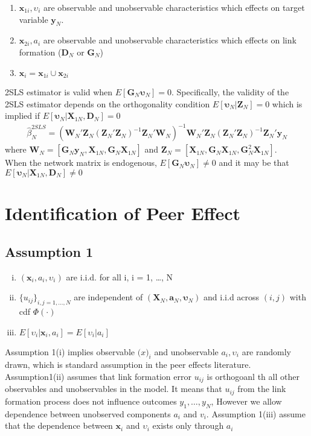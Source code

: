 \documentclass[11pt]{article}
\begin{document}
\begin{enumerate}
\item $\mathbf{x}_{1i} ,\upsilon_{i} $ are observable and unobservable characteristics which effects on target variable $\mathbf{y}_{N}$.
\item $\mathbf{x}_{2i} ,a_{i} $ are observable and unobservable characteristics which effects on link formation ($\mathbf{D}_{N}$ or $\mathbf{G}_{N}$)
\item $\mathbf{x}_{i} = \mathbf{x}_{1i} \cup \mathbf{x}_{2i}$
\end{enumerate}
 2SLS estimator is valid when $E[\mathbf{G}_{N}\boldsymbol{\upsilon}_{N}] = 0$. Specifically, the validity of the 2SLS estimator depends on the orthogonality condition $E[\boldsymbol{\upsilon}_{N}|\mathbf{Z}_{N}] = 0$ which is implied if $E[\boldsymbol{\upsilon}_{N}| \mathbf{X}_{1N},\mathbf{D}_{N}] = 0$
  \begin{align}
\hat{\beta}_{N}^{2SLS} = (\mathbf{W}_{N}'\mathbf{Z}_{N}(\mathbf{Z}_{N}'\mathbf{Z}_{N})^{-1}\mathbf{Z}_{N}'\mathbf{W}_{N})^{-1}\mathbf{W}_{N}'\mathbf{Z}_{N}(\mathbf{Z}_{N}'\mathbf{Z}_{N})^{-1}\mathbf{Z}_{N}'\mathbf{y}_{N}
  \end{align}
where $\mathbf{W}_{N} = [\mathbf{G}_{N}\mathbf{y}_{N},\mathbf{X}_{1N},\mathbf{G}_{N}\mathbf{X}_{1N}]$ and $\mathbf{Z}_{N} = [\mathbf{X}_{1N},\mathbf{G}_{N}\mathbf{X}_{1N},\mathbf{G}_{N}^2\mathbf{X}_{1N}]$.
\\



When the network matrix is endogenous, $E[\mathbf{G}_{N}\boldsymbol{\upsilon}_{N}] \neq 0$ and it may be that $E[\boldsymbol{\upsilon}_{N}| \mathbf{X}_{1N},\mathbf{D}_{N}] \neq 0$


\section{Identification of Peer Effect}

\subsection{Assumption 1} 
\begin{enumerate}[(i)]
\item $(\mathbf{x}_i , a_i, \upsilon_i)$ are i.i.d. for all i, i = 1, \dots, N
\item $\{ u_{ij} \}_{i,j = 1, \dots,N}$ are independent of $(\mathbf{X}_{N}, \mathbf{a}_{N}, \boldsymbol{\upsilon}_{N})$ and i.i.d across $(i,j)$ with cdf $\Phi(\cdot)$
\item $E[\upsilon_i | \mathbf{x}_{i}, a_{i}] = E[\upsilon_i | a_i]$
\end{enumerate}
Assumption 1(i) implies observable $\mathbf(x)_i$ and unobservable $a_i,\upsilon_i$ are randomly drawn, which is standard assumption in the peer effects literature. Assumption1(ii) assumes that link formation error $u_{ij}$ is orthogoanl th all other observables and unobservables in the model. It means that $u_{ij}$ from the link formation process does not influence outcomes $y_1, \dots , y_N$, However we allow dependence between unobserved components $a_i$ and $v_i$. Assumption 1(iii) assume that the dependence between $\mathbf{x}_i$ and $\upsilon_i$ exists only through $a_i$
\end{document}

